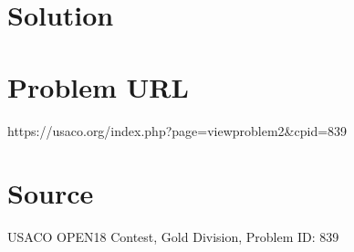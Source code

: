 \documentclass[12pt]{article}
\begin{document}
\section*{Solution}


\section*{Problem URL}
https://usaco.org/index.php?page=viewproblem2&cpid=839

\section*{Source}
USACO OPEN18 Contest, Gold Division, Problem ID: 839
\end{document}
